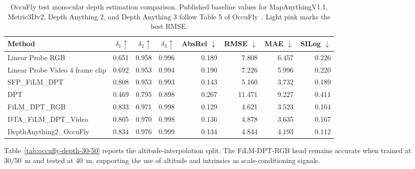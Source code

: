 \begin{table}[t]
\centering
\caption{OccuFly test monocular depth estimation comparison. Published baseline values for MapAnythingV1.1, Metric3Dv2, Depth Anything 2, and Depth Anything 3 follow Table 5 of OccuFly~\cite{gross2026occufly}. Light pink marks the best RMSE.}
\label{tab:mde_comparison}
\begin{tabular}{lrrrrrrr}
\toprule
Method & $\delta_1 \uparrow$ & $\delta_2 \uparrow$ & $\delta_3 \uparrow$ & AbsRel $\downarrow$ & RMSE $\downarrow$ & MAE $\downarrow$ & SILog $\downarrow$ \\
\midrule
Linear Probe RGB & 0.651 & 0.958 & 0.996 & 0.189 & 7.808 & 6.457 & 0.226 \\
Linear Probe Video 4 frame clip & 0.692 & 0.953 & 0.994 & 0.190 & 7.226 & 5.996 & 0.220 \\
SFP\_FiLM\_DPT & 0.808 & 0.953 & 0.993 & 0.143 & 5.160 & 3.732 & 0.189 \\
DPT & 0.469 & 0.795 & 0.898 & 0.267 & 11.471 & 9.227 & 0.411 \\
FiLM\_DPT\_RGB & 0.833 & 0.971 & 0.998 & 0.129 & \cellcolor{bestmiou}4.621 & 3.523 & 0.164 \\
DTA\_FiLM\_DPT\_Video & 0.805 & 0.970 & 0.998 & 0.136 & 4.878 & 3.635 & 0.167 \\
\midrule
DepthAnything2\_OccuFly~\cite{gross2026occufly} & 0.834 & 0.976 & 0.999 & 0.134 & 4.844 & 4.193 & 0.112 \\
\bottomrule
\end{tabular}
\end{table}

Table~\ref{tab:occufly-depth-30-50} reports the altitude-interpolation split. The FiLM-DPT-RGB head remains accurate when trained at 30/50~m and tested at 40~m, supporting the use of altitude and intrinsics as scale-conditioning signals.

\begin{table}[!htbp]
\centering
\caption{Best depth result for the altitude-interpolation split: training uses all scenes 01--09 at 30~m and 50~m altitude, validation uses scenes 01--04 at 40~m altitude, and testing uses scenes 05--08 at 40~m altitude.}
\label{tab:occufly-depth-30-50}
\end{table}

